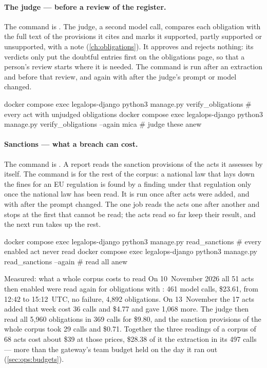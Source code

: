 \paragraph{The judge --- before a review of the register.} The command is . The judge, a
second model call, compares each obligation with the full text of the provisions it cites and
marks it supported, partly supported or unsupported, with a note (\cref{ch:obligations}). It
approves and rejects nothing: its verdicts only put the doubtful entries first on the
obligations page, so that a person's review starts where it is needed. The command is run
after an extraction and before that review, and again with  after the judge's
prompt or model changed.

\begin{codeblock}
docker compose exec legalops-django python3 manage.py verify_obligations             # every act with unjudged obligations
docker compose exec legalops-django python3 manage.py verify_obligations --again mica  # judge these anew
\end{codeblock}

\paragraph{Sanctions --- what a breach can cost.} The command is . A report reads the sanction
provisions of the acts it assesses by itself. The command is for the rest of the corpus: a
national law that lays down the fines for an EU regulation is found by a finding under that
regulation only once the national law has been read. It is run once after acts were added,
and with  after the prompt changed. The one job reads the acts one after
another and stops at the first that cannot be read; the acts read so far keep their result,
and the next run takes up the rest.

\begin{codeblock}
docker compose exec legalops-django python3 manage.py read_sanctions           # every enabled act never read
docker compose exec legalops-django python3 manage.py read_sanctions --again   # read all anew
\end{codeblock}

\begin{lessonbox}{Measured: what a whole corpus costs to read}
On 10~November 2026 all 51 acts then enabled were read again for obligations with
: 461 model calls, \$23.61, from 12:42 to 15:12~UTC, no failure, 4,892
obligations. On 13~November the 17 acts added that week cost 36 calls and \$4.77 and gave
1,068 more. The judge then read all 5,960 obligations in 369 calls for \$9.80, and the
sanction provisions of the whole corpus took 29 calls and \$0.71. Together the three readings
of a corpus of 68 acts cost about \$39 at those prices, \$28.38 of it the extraction in its
497 calls --- more than the gateway's team budget
held on the day it ran out (\cref{sec:ops:budgets}).
\end{lessonbox}

